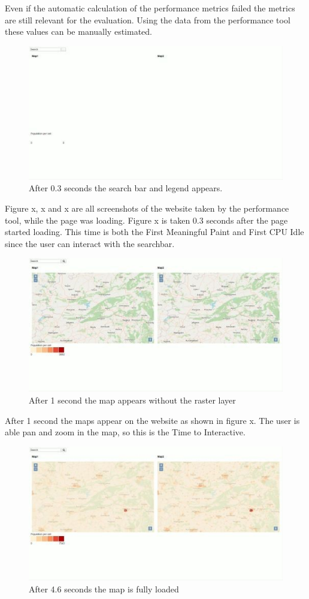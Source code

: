 Even if the automatic calculation of the performance metrics failed the metrics are still relevant for the evaluation. Using the data from the performance tool these values can be manually estimated. 

\begin{figure} [H]
	\centering
	\includegraphics[width=.8\textwidth]{Pictures/ScreenshotLoading1}
	\caption{After 0.3 seconds the search bar and legend appears.}
	\label{ScreenshotLoading1}
\end{figure}

Figure x, x and x are all screenshots of the website taken by the performance tool, while the page was loading. Figure x is taken 0.3 seconds after the page started loading. This time is both the First Meaningful Paint and First CPU Idle since the user can interact with the searchbar.

\begin{figure} [H]
	\centering
	\includegraphics[width=.8\textwidth]{Pictures/ScreenshotLoading2}
	\caption{After 1 second the map appears without the raster layer}
	\label{ScreenshotLoading2}
\end{figure}

After 1 second the maps appear on the website as shown in figure x. The user is able pan and zoom in the map, so this is the Time to Interactive. 

\begin{figure} [H]
	\centering
	\includegraphics[width=.8\textwidth]{Pictures/ScreenshotLoading3}
	\caption{After 4.6 seconds the map is fully loaded}
	\label{ScreenshotLoading3}
\end{figure}

